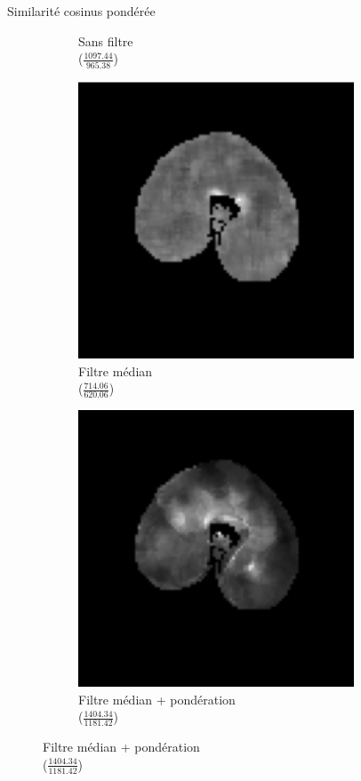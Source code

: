 \documentclass[10pt]{beamer}
\begin{document}
\begin{frame}{Similarité cosinus pondérée}
\begin{figure}[ht]
\begin{subfigure}[t]{0.25\textwidth}
        \caption{Sans filtre\\($\frac{1097.44}{965.38}$)}
        \label{subfig:cosine_msi}
      \end{subfigure}%
    \begin{subfigure}[t]{0.25\textwidth}
      \centering
      \includegraphics[width=0.9\textwidth]{fig/cosine_median}
      \caption{Filtre médian\\($\frac{714.06}{620.06}$)}
      \label{subfig:cosine_median}
    \end{subfigure}%
    \begin{subfigure}[t]{0.25\textwidth}
      \centering
      \includegraphics[width=0.9\textwidth]{fig/cosine_weight}
      \caption{Filtre médian + pondération\\($\frac{1404.34}{1181.42}$)}
      \label{subfig:cosine_weight}
    \end{subfigure}%


\end{figure}
\end{frame}
\end{document}
